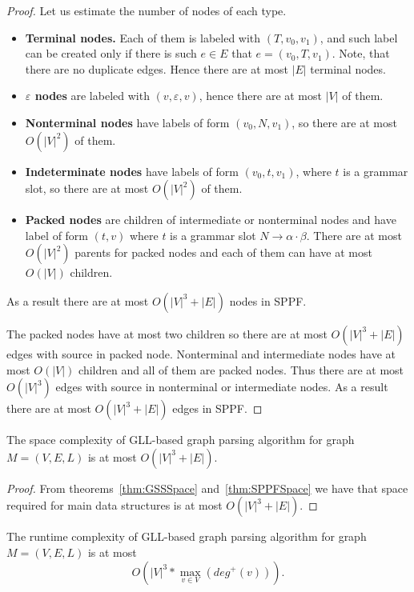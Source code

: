\begin{proof}
Let us estimate the number of nodes of each type.
\begin{itemize}
\item \textbf{Terminal nodes.} 
Each of them is labeled with $(T, v_0, v_1)$, and such label can be created only if there is such $e \in E$ that $e=(v_0,T,v_1)$. 
Note, that there are no duplicate edges. 
Hence there are at most $|E|$ terminal nodes.
\item \textbf{$\varepsilon$ nodes} are labeled with $(v,\varepsilon,v)$, hence there are at most $|V|$ of them. 
\item \textbf{Nonterminal nodes} have labels of form $(v_0,N,v_1)$, so there are at most $O(|V|^2)$ of them.
\item \textbf{Indeterminate nodes} have labels of form $(v_0,t,v_1)$, where $t$ is a grammar slot, so there are at most $O(|V|^2)$ of them.
\item \textbf{Packed nodes} are children of intermediate or nonterminal nodes and have label of form $(t,v)$ where $t$ is a grammar slot $N \rightarrow \alpha \cdot \beta$.
There are at most $O(|V|^2)$ parents for packed nodes and each of them can have at most $O(|V|)$ children.
\end{itemize}

As a result there are at most $O(|V|^3 + |E|)$ nodes in SPPF.

The packed nodes have at most two children so there are at most $O(|V|^3 + |E|)$ edges with source in packed node. 
Nonterminal and intermediate nodes have at most $O(|V|)$ children and all of them are packed nodes.
Thus there are at most $O(|V|^3)$ edges with source in nonterminal or intermediate nodes. As a result there are at most $O(|V|^3 + |E|)$ edges in SPPF.


\end{proof}

\begin{mytheorem}
The space complexity of GLL-based graph parsing algorithm for graph $M=(V,E,L)$ is at most $O(|V|^3 + |E|)$.
\end{mytheorem}

\begin{proof}

From theorems~\ref{thm:GSSSpace} and~\ref{thm:SPPFSpace} we have that space required for main data structures is at most $O(|V|^3 + |E|)$. 

\end{proof}


\begin{mytheorem}\label{thm:complexity}
The runtime complexity of GLL-based graph parsing algorithm for graph $M=(V,E,L)$ is at most $$O\left(|V|^3*\max\limits_{v \in V}\left(deg^+\left(v\right)\right)\right).$$
\end{mytheorem}

